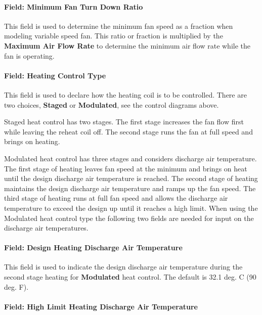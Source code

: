 \paragraph{Field: Minimum Fan Turn Down Ratio}\label{field-fan-turn-down-ratio-parallelPIU}

This field is used to determine the minimum fan speed as a fraction when modeling variable speed fan. This ratio or fraction is multiplied by the \textbf{Maximum Air Flow Rate} to determine the minimum air flow rate while the fan is operating.

\paragraph{Field: Heating Control Type}\label{field-heat-control-type-parallelPIU}

This field is used to declare how the heating coil is to be controlled. There are two choices, \textbf{Staged} or \textbf{Modulated}, see the control diagrams above.

Staged heat control has two stages. The first stage increases the fan flow first while leaving the reheat coil off. The second stage runs the fan at full speed and brings on heating.

Modulated heat control has three stages and considers discharge air temperature. The first stage of heating leaves fan speed at the minimum and brings on heat until the design discharge air temperature is reached. The second stage of heating maintains the design discharge air temperature and ramps up the fan speed. The third stage of heating runs at full fan speed and allows the discharge air temperature to exceed the design up until it reaches a high limit. When using the Modulated heat control type the following two fields are needed for input on the discharge air temperatures.

\paragraph{Field: Design Heating Discharge Air Temperature}\label{field-heat-design-DAT-parallelPIU}

This field is used to indicate the design discharge air temperature during the second stage heating for \textbf{Modulated} heat control. The default is 32.1 deg. C (90 deg. F).

\paragraph{Field: High Limit Heating Discharge Air Temperature}\label{field-heat-limit-DAT-parallelPIU}

